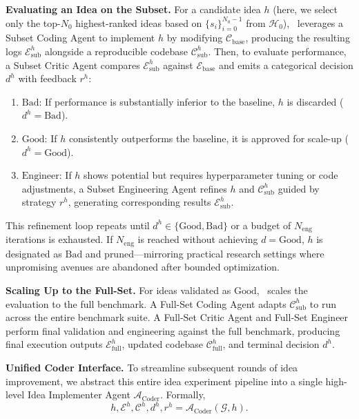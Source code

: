 \noindent\textbf{Evaluating an Idea on the Subset.}
For a candidate idea $h$ (here, we select only the top-$N_0$ highest-ranked ideas based on $\{s_i\}_{i=0}^{N_0-1}$ from $\mathcal{H}_0$), \sname~leverages a Subset Coding Agent to implement $h$ by modifying $\mathcal{C}_{\mathrm{base}}$, producing the resulting logs $\mathcal{E}_{\mathrm{sub}}^h$ alongside a reproducible codebase $\mathcal{C}_\mathrm{sub}^h$.
Then, to evaluate performance, a Subset Critic Agent compares $\mathcal{E}_{\mathrm{sub}}^h$ against $\mathcal{E}_{\mathrm{base}}$ and emits a categorical decision $d^h$ with feedback $r^h$:
\begin{enumerate}[leftmargin=*, noitemsep, topsep=2pt]
    \item $\mathrm{Bad}$: If performance is substantially inferior to the baseline, $h$ is discarded ($d^h = \mathrm{Bad}$).
    \item $\mathrm{Good}$: If $h$ consistently outperforms the baseline, it is approved for scale-up ($d^h = \mathrm{Good}$).
    \item $\mathrm{Engineer}$: If $h$ shows potential but requires hyperparameter tuning or code adjustments, a Subset Engineering Agent refines $h$ and $\mathcal{C}_{\mathrm{sub}}^h$ guided by strategy $r^h$, generating corresponding results $\mathcal{E}_{\mathrm{sub}}^h$.
\end{enumerate}
This refinement loop repeats until $d^h \in \{\mathrm{Good}, \mathrm{Bad}\}$ or a budget of $N_{\mathrm{eng}}$ iterations is exhausted. If $N_{\mathrm{eng}}$ is reached without achieving $d = \mathrm{Good}$, $h$ is designated as $\mathrm{Bad}$ and pruned—mirroring practical research settings where unpromising avenues are abandoned after bounded optimization.


\noindent\textbf{Scaling Up to the Full-Set.}
For ideas validated as $\mathrm{Good}$, \sname~scales the evaluation to the full benchmark. A Full-Set Coding Agent adapts $\mathcal{C}_{\mathrm{sub}}^h$ to run across the entire benchmark suite.
A Full-Set Critic Agent and Full-Set Engineer perform final validation and engineering against the full benchmark, producing final execution outputs $\mathcal{E}_{\mathrm{full}}^h$, updated codebase $\mathcal{C}_{\mathrm{full}}^h$, and terminal decision $d^h$.

\noindent\textbf{Unified Coder Interface.}
To streamline subsequent rounds of idea improvement, we abstract this entire idea experiment pipeline into a single high-level Idea Implementer Agent $\mathcal{A}_{\mathrm{Coder}}$. Formally,
\begin{equation}
    h,\mathcal{E}^h, \mathcal{C}^h, d^h, r^h = \mathcal{A}_{\mathrm{Coder}}(\mathcal{G}, h).
\end{equation}


